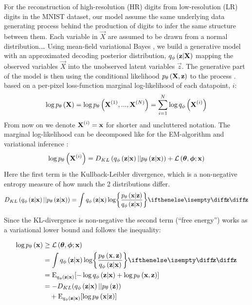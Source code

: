 For the reconstruction of high-resolution (HR) digits from low-resolution (LR) digits in the MNIST dataset, our model assume the same underlying data generating process behind the production of digits to infer the same structure between them. Each variable in $\vec{X}$ are assumed to be drawn from a normal distribution.\dots 
Using mean-field variational Bayes \cite{Kingma2014}, we build a generative model with an approximated decoding posterior distribution, $q_{\phi}\left(\bm{\mathrm{z}}|\bm{\mathrm{X}}\right)$ mapping the observed variables $\vec{X}$ into the unobserved latent variables $\vec{z}$. The generative part of the model is then using the conditional likelihood $p_{\theta}\left(\bm{\mathrm{X}},\bm{\mathrm{z}}\right)$ to  the process  .  based on a per-pixel loss-function  marginal log-likelihood of each datapoint, $i$:
\begin{equation}
	\log p_{\theta}\left(\bm{\mathrm{X}}\right) = \log p_{\theta}\left(\bm{\mathrm{X}}^{(1)}, ..., \bm{\mathrm{X}}^{(N)}\right) = \sum^N_{i=1} \log q_{\phi}\left(\bm{\mathrm{X}}^{(i)}\right) 
\end{equation}
From now on we denote $\bm{\mathrm{X}}^{(i)} = \bm{\mathrm{x}}$ for shorter and uncluttered notation.
The marginal log-likelihood can be decomposed like for the EM-algorithm and variational inference \cite[\S10.2]{Bishop2006}:
\begin{equation}
	\log p_{\theta}\left(\bm{\mathrm{X}}^{(i)}\right) = D_{KL}\left( q_{\phi}\left(\bm{\mathrm{z}}|\bm{\mathrm{x}}\right)||p_{\theta}\left(\bm{\mathrm{z}}|\bm{\mathrm{x}}\right)\right) + \mathcal{L}\left(\bm{\mathrm{\theta}},\bm{\mathrm{\phi}};\bm{\mathrm{x}}\right)
\end{equation} 
Here the first term is the Kullback-Leibler divergence, which is a non-negative entropy measure of how much the 2 distributions differ.
\begin{equation}
	D_{KL}\left( \enc{\vec{z}|\vec{x}}||\dec{\vec{z}|\vec{x}}\right) = \int \enc{\vec{z}|\vec{x}} \log \curlies*{ \frac{\dec{\vec{x}|\vec{z}}}{\enc{\vec{z}|\vec{x}} } } \D{\vec{z}}
\end{equation}

Since the KL-divergence is non-negative the second term (``free energy'') works as a variational lower bound and follows the inequality:

\begin{gather}
	\begin{split}
		\log \dec{\vec{x}} & \ge \mathcal{L}\left(\vec{\theta},\vec{\phi};\vec{x}\right)
		\\ & =
		\int \enc{\vec{z}|\vec{x}} \log \curlies*{ \frac{\dec{\vec{x},\vec{z}}}{\enc{\vec{z}|\vec{x}} } } \D{\vec{z}} \\ 
		& = \E_{\enc{\vec{z}|\vec{x}}} \brackets{- \log \enc{\vec{z}|\vec{x}} + \log \dec{\vec{x},\vec{z}} } 
		\\
		& = -D_{KL}\parens{ \enc{\vec{z}|\vec{x}}||\dec{\vec{z}} } 
		\\ 
		& \quad+ \E_{\enc{\vec{z}|\vec{x}}} \brackets{\log \dec{\vec{x}|\vec{z}} }   	
	\end{split} 
\end{gather}

